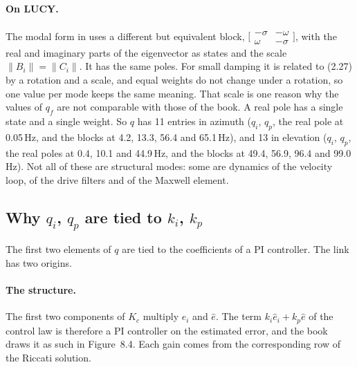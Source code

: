 \documentclass[10pt,a4paper]{article}
\numberwithin{equation}{section}
\begin{document}
\paragraph{On LUCY.} The modal form in  uses a different but equivalent block, $\bigl[\begin{smallmatrix}-\sigma&-\omega\\\omega&-\sigma\end{smallmatrix}\bigr]$, with the real and imaginary parts of the eigenvector as states and the scale $\|B_i\|=\|C_i\|$. It has the same poles. For small damping it is related to (2.27) by a rotation and a scale, and equal weights do not change under a rotation, so one value per mode keeps the same meaning. That scale is one reason why the values of $q_f$ are not comparable with those of the book. A real pole has a single state and a single weight. So $q$ has 11 entries in azimuth ($q_i$, $q_p$, the real pole at 0.05\,Hz, and the blocks at 4.2, 13.3, 56.4 and 65.1\,Hz), and 13 in elevation ($q_i$, $q_p$, the real poles at 0.4, 10.1 and 44.9\,Hz, and the blocks at 49.4, 56.9, 96.4 and 99.0\,Hz). Not all of these are structural modes: some are dynamics of the velocity loop, of the drive filters and of the Maxwell element.

\subsection{Why $q_i$, $q_p$ are tied to $k_i$, $k_p$}
The first two elements of $q$ are tied to the coefficients of a PI controller. The link has two origins.

\paragraph{The structure.} The first two components of $K_c$ multiply $\hat e_i$ and $\hat e$. The term $k_i\hat e_i+k_p\hat e$ of the control law is therefore a PI controller on the estimated error, and the book draws it as such in Figure~8.4. Each gain comes from the corresponding row of the Riccati solution.
\end{document}
